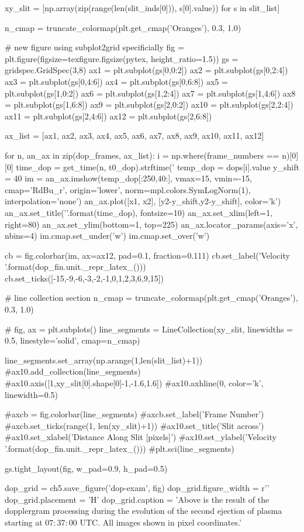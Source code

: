 \begin{pycode}[chapter5]
xy_slit = [np.array(zip(range(len(slit_inds[0])), s[0].value)) for s in slit_list]


n_cmap = truncate_colormap(plt.get_cmap('Oranges'), 0.3, 1.0)


# new figure using subplot2grid specificially
fig = plt.figure(figsize=texfigure.figsize(pytex, height_ratio=1.5))
gs = gridspec.GridSpec(3,8)
ax1 = plt.subplot(gs[0,0:2])
ax2 = plt.subplot(gs[0,2:4])
ax3 = plt.subplot(gs[0,4:6])
ax4 = plt.subplot(gs[0,6:8])
ax5 = plt.subplot(gs[1,0:2])
ax6 = plt.subplot(gs[1,2:4])
ax7 = plt.subplot(gs[1,4:6])
ax8 = plt.subplot(gs[1,6:8])
ax9 = plt.subplot(gs[2,0:2])
ax10 = plt.subplot(gs[2,2:4])
ax11 = plt.subplot(gs[2,4:6])
ax12 = plt.subplot(gs[2,6:8])

ax_list = [ax1, ax2, ax3, ax4, ax5, ax6,
		   ax7, ax8, ax9, ax10, ax11, ax12]

for n, an_ax in zip(dop_frames, ax_list):
	i = np.where(frame_numbers == n)[0][0]
	time_dop = get_time(n, t0_dop).strftime('%
	temp_dop = dops[i].value
	y_shift = 40
	im = an_ax.imshow(temp_dop[:250,40:], vmax=15, vmin=-15,
	cmap='RdBu_r', origin='lower',
	norm=mpl.colors.SymLogNorm(1),
	interpolation='none')
	an_ax.plot([x1, x2], [y2-y_shift,y2-y_shift], color='k')
	an_ax.set_title('{}'.format(time_dop), fontsize=10)
	an_ax.set_xlim(left=1, right=80)
	an_ax.set_ylim(bottom=1, top=225)
	an_ax.locator_params(axis='x', nbins=4)
	im.cmap.set_under('w')
	im.cmap.set_over('w')

cb = fig.colorbar(im, ax=ax12, pad=0.1, fraction=0.111)
cb.set_label('Velocity {}'.format(dop_fin.unit._repr_latex_()))
cb.set_ticks([-15,-9,-6,-3,-2,-1,0,1,2,3,6,9,15])

# line collection section
n_cmap = truncate_colormap(plt.get_cmap('Oranges'), 0.3, 1.0)

# fig, ax = plt.subplots()
line_segments = LineCollection(xy_slit,
							   linewidths = 0.5,
							   linestyle='solid',
							   cmap=n_cmap)
							   
line_segments.set_array(np.arange(1,len(slit_list)+1))
#ax10.add_collection(line_segments)
#ax10.axis([1,xy_slit[0].shape[0]-1,-1.6,1.6])
#ax10.axhline(0, color='k', linewidth=0.5)

#axcb = fig.colorbar(line_segments)
#axcb.set_label('Frame Number')
#axcb.set_ticks(range(1, len(xy_slit)+1))
#ax10.set_title('Slit across')
#ax10.set_xlabel('Distance Along Slit [pixels]')
#ax10.set_ylabel('Velocity {}'.format(dop_fin.unit._repr_latex_()))
#plt.sci(line_segments)

gs.tight_layout(fig, w_pad=0.9, h_pad=0.5)

dop_grid = ch5.save_figure('dop-exam', fig)
dop_grid.figure_width = r'\textwidth'
dop_grid.placement = 'H'
dop_grid.caption = 'Above is the result of the dopplergram processing during the evolution of the second ejection of plasma starting at $07:37:00$ UTC. All images shown in pixel coordinates.'


\end{pycode}

